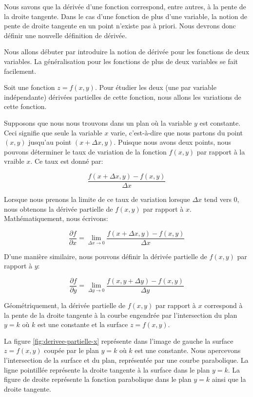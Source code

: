 \documentclass[]{book}
\theoremstyle{definition}
\theoremstyle{definition}
\theoremstyle{definition}
\theoremstyle{remark}
\begin{document}
Nous savons que la dérivée d'une fonction correspond, entre autres, à la
pente de la droite tangente. Dans le cas d'une fonction de plus d'une
variable, la notion de pente de droite tangente en un point n'existe pas
à priori. Nous devrons donc définir une nouvelle définition de dérivée.

Nous allons débuter par introduire la notion de dérivée pour les
fonctions de deux variables. La généralisation pour les fonctions de
plus de deux variables se fait facilement.

Soit une fonction \(z=f(x,y)\). Pour étudier les deux (une par variable
indépendante) dérivées partielles de cette fonction, nous allons les
variations de cette fonction.

Supposons que nous nous trouvons dans un plan où la variable \(y\) est
constante. Ceci signifie que seule la variable \(x\) varie, c'est-à-dire
que nous partons du point \((x,y)\) jusqu'au point \((x+\Delta x,y)\).
Puisque nous avons deux points, nous pouvons déterminer le taux de
variation de la fonction \(f(x,y)\) par rapport à la vraible \(x\). Ce
taux est donné par:

\[  \dfrac{f(x+\Delta x,y)-f(x,y)}{\Delta x} \]

Lorsque nous prenons la limite de ce taux de variation lorsque
\(\Delta x\) tend vers \(0\), nous obtenons la dérivée partielle de
\(f(x,y)\) par rapport à \(x\). Mathématiquement, nous écrivons:

\[ \dfrac{\partial f}{\partial x}=\lim_{\Delta x \to 0} \dfrac{f(x+\Delta x,y)-f(x,y)}{\Delta x} \]

D'une manière similaire, nous pouvons définir la dérivée partielle de
\(f(x,y)\) par rapport à \(y\):

\[ \dfrac{\partial f}{\partial y}=\lim_{\Delta y \to 0} \dfrac{f(x,y+\Delta y)-f(x,y)}{\Delta y} \]

Géométriquement, la dérivée partielle de \(f(x,y)\) par rapport à \(x\)
correspond à la pente de la droite tangente à la courbe engendrée par
l'intersection du plan \(y=k\) où \(k\) est une constante et la surface
\(z=f(x,y)\).

La figure \ref{fig:derivee-partielle-x} représente dans l'image de
gauche la surface \(z=f(x,y)\) coupée par le plan \(y=k\) où \(k\) est
une constante. Nous apercevons l'intersection de la surface et du plan,
représentée par une courbe parabolique. La ligne pointillée représente
la droite tangente à la surface dans le plan \(y=k\). La figure de
droite représente la fonction parabolique dans le plan \(y=k\) ainsi que
la droite tangente.
\end{document}

